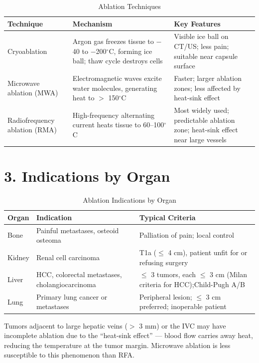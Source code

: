 \begin{table}[h]
\centering
\begin{tabular}{@{}p{}p{}p{}@{}}
\hline
\textbf{Technique} & \textbf{Mechanism} & \textbf{Key Features} \\
\hline
Cryoablation & Argon gas freezes tissue to $-$40 to $-$200$^\circ$C, forming ice ball; thaw cycle destroys cells & Visible ice ball on CT/US; less pain; suitable near capsule surface \\
Microwave ablation (MWA) & Electromagnetic waves excite water molecules, generating heat to $>$ 150$^\circ$C & Faster; larger ablation zones; less affected by heat-sink effect \\
Radiofrequency ablation (RMA) & High-frequency alternating current heats tissue to 60--100$^\circ$C & Most widely used; predictable ablation zone; heat-sink effect near large vessels \\
\hline
\end{tabular}
\caption{Ablation Techniques}
\end{table}

\section{3. Indications by Organ}

\begin{table}[h]
\centering
\begin{tabular}{@{}p{}p{}p{}@{}}
\hline
\textbf{Organ} & \textbf{Indication} & \textbf{Typical Criteria} \\
\hline
Bone & Painful metastases, osteoid osteoma & Palliation of pain; local control \\
Kidney & Renal cell carcinoma & T1a ($\leq$ 4 cm), patient unfit for or refusing surgery \\
Liver & HCC, colorectal metastases, cholangiocarcinoma & $\leq$ 3 tumors, each $\leq$ 3 cm (Milan criteria for HCC);Child-Pugh A/B \\
Lung & Primary lung cancer or metastases & Peripheral lesion; $\leq$ 3 cm preferred; inoperable patient \\
\hline
\end{tabular}
\caption{Ablation Indications by Organ}
\end{table}

\begin{pearlbox}
Tumors adjacent to large hepatic veins ($>$ 3 mm) or the IVC may have incomplete ablation due to the ``heat-sink effect'' --- blood flow carries away heat, reducing the temperature at the tumor margin. Microwave ablation is less susceptible to this phenomenon than RFA.
\end{pearlbox}


